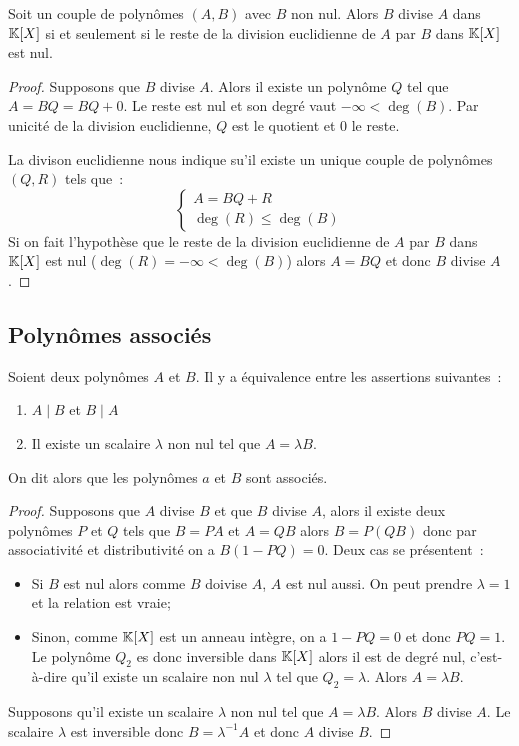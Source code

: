 \begin{prop}
  Soit un couple de polynômes $(A,B)$ avec $B$ non nul. Alors $B$ divise $A$ dans $\mathbb{K}[X]$ si et seulement si le reste de la division euclidienne de $A$ par $B$ dans $\mathbb{K}[X]$ est nul.
\end{prop}
\begin{proof}
  Supposons que $B$ divise $A$. Alors il existe un polynôme $Q$ tel que $A=BQ = BQ+0$. Le reste est nul et son degré vaut $-\infty < \deg(B)$. Par unicité de la division euclidienne, $Q$ est le quotient et $0$ le reste.

  La divison euclidienne nous indique su'il existe un unique couple de polynômes $(Q,R)$ tels que~:
  \begin{equation}
    \begin{cases}
      A=BQ+R \\ \deg(R) \leqslant \deg(B)
    \end{cases}
  \end{equation}
  Si on fait l'hypothèse que le reste de la division euclidienne de $A$ par $B$ dans $\mathbb{K}[X]$ est nul ($\deg(R)=-\infty<\deg(B)$) alors $A=BQ$ et donc $B$ divise $A$.
\end{proof}

\subsection{Polynômes associés}

\begin{prop}
  Soient deux polynômes $A$ et $B$. Il y a équivalence entre les assertions suivantes~:
  \begin{enumerate}
  \item $A\mid{}B$ et $B\mid{}A$
  \item Il existe un scalaire $\lambda$ non nul tel que $A=\lambda B$.
  \end{enumerate}
  On dit alors que les polynômes $a$ et $B$ sont associés.
\end{prop}

\begin{proof}
  Supposons que $A$ divise $B$ et que $B$ divise $A$, alors il existe deux polynômes $P$ et $Q$ tels que $B=PA$ et $A=QB$ alors $B=P(QB)$ donc par associativité et distributivité on a $B(1-PQ)=0$. Deux cas se présentent~:
  \begin{itemize}
  \item Si $B$ est nul alors comme $B$ doivise $A$, $A$ est nul aussi. On peut prendre $\lambda=1$ et la relation est vraie;
  \item Sinon, comme $\mathbb{K}[X]$ est un anneau intègre, on a $1-PQ=0$ et donc $PQ=1$. Le polynôme $Q_2$ es donc inversible dans $\mathbb{K}[X]$ alors il est de degré nul, c'est-à-dire qu'il existe un scalaire non nul $\lambda$ tel que $Q_2=\lambda$. Alors $A=\lambda B$.
  \end{itemize}

  Supposons qu'il existe un scalaire $\lambda$ non nul tel que $A=\lambda B$. Alors $B$ divise $A$. Le scalaire $\lambda$ est inversible donc $B=\lambda^{-1}A$ et donc $A$ divise $B$.
\end{proof}

